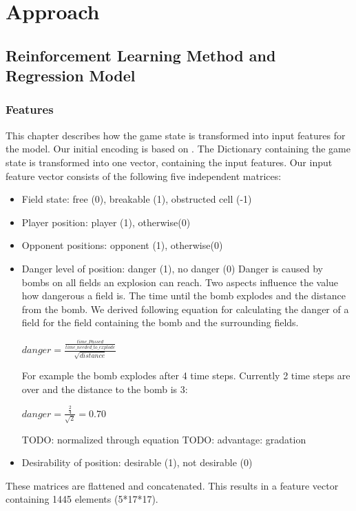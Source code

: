 \section{Approach} 
\label{approach}

\subsection{Reinforcement Learning Method and Regression Model} 
\label{ch:approachA}

\subsubsection{Features}
\label{ch:approachAa}

This chapter describes how the game state is transformed into input features for the model. 
Our initial encoding is based on \cite{Kormelink2018}. The Dictionary containing the game state is transformed into one vector, containing the input features.
Our input feature vector consists of the following five independent matrices:
\begin{itemize}
	\item Field state: free (0), breakable (1), obstructed cell (-1)
	\item Player position: player (1), otherwise(0)
	\item Opponent positions: opponent (1), otherwise(0)
	\item Danger level of position: danger (1), no danger (0) \newline
	Danger is caused by bombs on all fields an explosion can reach. Two aspects influence the value how dangerous a field is. The time until the bomb explodes and the distance from the bomb. We derived following equation for calculating the danger of a field for the field containing the bomb and the surrounding fields.
	
	$ danger = \frac{\frac{time\_Passed}{time\_needed\_to\_explode}}{\sqrt{distance}} $
	
	For example the bomb explodes after 4 time steps. Currently 2 time steps are over and the distance to the bomb is 3:
	
	$ danger = \frac{\frac{2}{4}}{\sqrt{2}} = 0.70 $
	
	TODO: normalized through equation
	TODO: advantage: gradation
	
	\item Desirability of position: desirable (1), not desirable (0)
\end{itemize}
These matrices are flattened and concatenated. This results in a feature vector containing 1445 elements (5*17*17).

